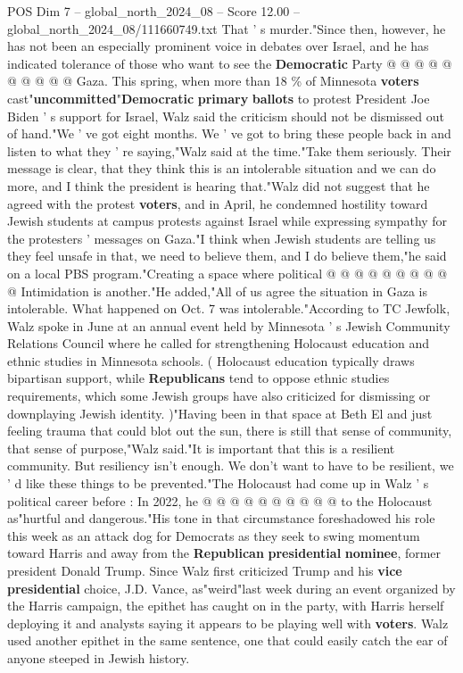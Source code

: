 \begin{textsample}{POS Dim 7 – global\_north\_2024\_08 – Score 12.00 – global\_north\_2024\_08/111660749.txt}
That ' s murder."Since then, however, he has not been an especially prominent voice in debates over Israel, and he has indicated tolerance of those who want to see the \textbf{Democratic} Party @ @ @ @ @ @ @ @ @ @ Gaza.
This spring, when more than 18 \% of Minnesota \textbf{voters} cast"\textbf{uncommitted}"\textbf{Democratic} \textbf{primary} \textbf{ballots} to protest President Joe Biden ' s support for Israel, Walz said the criticism should not be dismissed out of hand."We ' ve got eight months.
We ' ve got to bring these people back in and listen to what they ' re saying,"Walz said at the time."Take them seriously.
Their message is clear, that they think this is an intolerable situation and we can do more, and I think the president is hearing that."Walz did not suggest that he agreed with the protest \textbf{voters}, and in April, he condemned hostility toward Jewish students at campus protests against Israel while expressing sympathy for the protesters ' messages on Gaza."I think when Jewish students are telling us they feel unsafe in that, we need to believe them, and I do believe them,"he said on a local PBS program."Creating a space where political @ @ @ @ @ @ @ @ @ @ Intimidation is another."He added,"All of us agree the situation in Gaza is intolerable.
What happened on Oct. 7 was intolerable."According to TC Jewfolk, Walz spoke in June at an annual event held by Minnesota ' s Jewish Community Relations Council where he called for strengthening Holocaust education and ethnic studies in Minnesota schools. ( Holocaust education typically draws bipartisan support, while \textbf{Republicans} tend to oppose ethnic studies requirements, which some Jewish groups have also criticized for dismissing or downplaying Jewish identity. )"Having been in that space at Beth El and just feeling trauma that could blot out the sun, there is still that sense of community, that sense of purpose,"Walz said."It is important that this is a resilient community.
But resiliency isn't enough.
We don't want to have to be resilient, we ' d like these things to be prevented."The Holocaust had come up in Walz ' s political career before : In 2022, he @ @ @ @ @ @ @ @ @ @ to the Holocaust as"hurtful and dangerous."His tone in that circumstance foreshadowed his role this week as an attack dog for Democrats as they seek to swing momentum toward Harris and away from the \textbf{Republican} \textbf{presidential} \textbf{nominee}, former president Donald Trump.
Since Walz first criticized Trump and his \textbf{vice} \textbf{presidential} choice, J.D.
Vance, as"weird"last week during an event organized by the Harris campaign, the epithet has caught on in the party, with Harris herself deploying it and analysts saying it appears to be playing well with \textbf{voters}.
Walz used another epithet in the same sentence, one that could easily catch the ear of anyone steeped in Jewish history.

\end{textsample}
